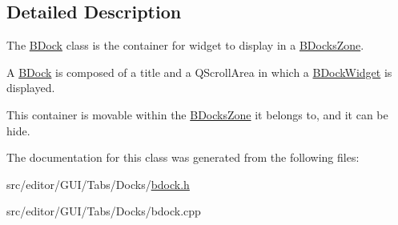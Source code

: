 \subsection{Detailed Description}
The \hyperlink{class_b_dock}{B\+Dock} class is the container for widget to display in a \hyperlink{class_b_docks_zone}{B\+Docks\+Zone}. 

A \hyperlink{class_b_dock}{B\+Dock} is composed of a title and a Q\+Scroll\+Area in which a \hyperlink{class_b_dock_widget}{B\+Dock\+Widget} is displayed.

This container is movable within the \hyperlink{class_b_docks_zone}{B\+Docks\+Zone} it belongs to, and it can be hide. 

The documentation for this class was generated from the following files\+:\begin{DoxyCompactItemize}
\item 
src/editor/\+G\+U\+I/\+Tabs/\+Docks/\hyperlink{bdock_8h}{bdock.\+h}\item 
src/editor/\+G\+U\+I/\+Tabs/\+Docks/bdock.\+cpp\end{DoxyCompactItemize}
